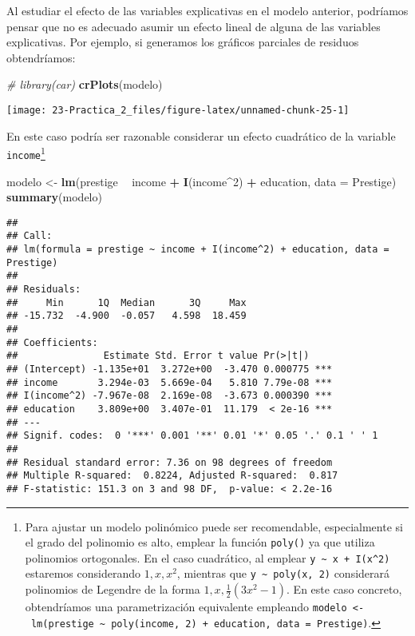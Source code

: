 \documentclass[
]{book}
\newenvironment{Shaded}{\begin{snugshade}}{\end{snugshade}}
\newcommand{\CommentTok}[1]{\textcolor[rgb]{0.56,0.35,0.01}{\textit{#1}}}
\newcommand{\DataTypeTok}[1]{\textcolor[rgb]{0.13,0.29,0.53}{#1}}
\newcommand{\DecValTok}[1]{\textcolor[rgb]{0.00,0.00,0.81}{#1}}
\newcommand{\KeywordTok}[1]{\textcolor[rgb]{0.13,0.29,0.53}{\textbf{#1}}}
\newcommand{\NormalTok}[1]{#1}
\newcommand{\OperatorTok}[1]{\textcolor[rgb]{0.81,0.36,0.00}{\textbf{#1}}}
\newcommand{\StringTok}[1]{\textcolor[rgb]{0.31,0.60,0.02}{#1}}
\theoremstyle{definition}
\theoremstyle{definition}
\theoremstyle{definition}
\theoremstyle{remark}
\begin{document}
Al estudiar el efecto de las variables explicativas en el modelo
anterior, podríamos pensar que no es adecuado asumir un efecto lineal
de alguna de las variables explicativas. Por ejemplo, si generamos los gráficos
parciales de residuos obtendríamos:

\begin{Shaded}
\begin{Highlighting}[]
\CommentTok{# library(car)}
\KeywordTok{crPlots}\NormalTok{(modelo)}
\end{Highlighting}
\end{Shaded}

\begin{center}\texttt{[image: 23-Practica\_2\_files/figure-latex/unnamed-chunk-25-1]} \end{center}

En este caso podría ser razonable considerar un efecto cuadrático
de la variable \texttt{income}\footnote{Para ajustar un modelo polinómico
  puede ser recomendable, especialmente si el grado del polinomio es alto,
  emplear la función \texttt{poly()} ya que utiliza polinomios ortogonales.
  En el caso cuadrático, al emplear \texttt{y\ \textasciitilde{}\ x\ +\ I(x\^{}2)}
  estaremos considerando \(1, x, x^2\), mientras que \texttt{y\ \textasciitilde{}\ poly(x,\ 2)} considerará
  polinomios de Legendre de la forma \(1, x, \frac{1}{2}(3x^2-1)\).
  En este caso concreto, obtendríamos una parametrización equivalente
  empleando \texttt{modelo\ \textless{}-\ lm(prestige\ \textasciitilde{}\ poly(income,\ 2)\ +\ education,\ data\ =\ Prestige)}.}

\begin{Shaded}
\begin{Highlighting}[]
\NormalTok{modelo <-}\StringTok{ }\KeywordTok{lm}\NormalTok{(prestige }\OperatorTok{~}\StringTok{ }\NormalTok{income }\OperatorTok{+}\StringTok{ }\KeywordTok{I}\NormalTok{(income}\OperatorTok{^}\DecValTok{2}\NormalTok{) }\OperatorTok{+}\StringTok{ }\NormalTok{education, }\DataTypeTok{data =}\NormalTok{ Prestige)}
\KeywordTok{summary}\NormalTok{(modelo)}
\end{Highlighting}
\end{Shaded}

\begin{verbatim}
## 
## Call:
## lm(formula = prestige ~ income + I(income^2) + education, data = Prestige)
## 
## Residuals:
##     Min      1Q  Median      3Q     Max 
## -15.732  -4.900  -0.057   4.598  18.459 
## 
## Coefficients:
##               Estimate Std. Error t value Pr(>|t|)    
## (Intercept) -1.135e+01  3.272e+00  -3.470 0.000775 ***
## income       3.294e-03  5.669e-04   5.810 7.79e-08 ***
## I(income^2) -7.967e-08  2.169e-08  -3.673 0.000390 ***
## education    3.809e+00  3.407e-01  11.179  < 2e-16 ***
## ---
## Signif. codes:  0 '***' 0.001 '**' 0.01 '*' 0.05 '.' 0.1 ' ' 1
## 
## Residual standard error: 7.36 on 98 degrees of freedom
## Multiple R-squared:  0.8224, Adjusted R-squared:  0.817 
## F-statistic: 151.3 on 3 and 98 DF,  p-value: < 2.2e-16
\end{verbatim}
\end{document}
